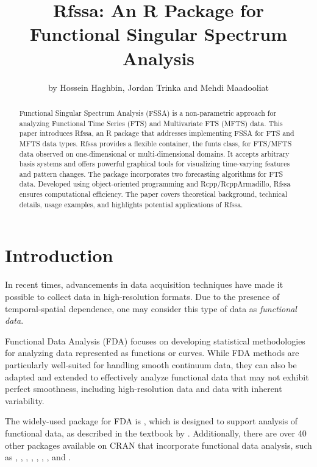 
\title{Rfssa: An R Package for Functional Singular Spectrum Analysis}

\author{by Hossein Haghbin, Jordan Trinka and Mehdi Maadooliat}

\maketitle

\begin{abstract}

Functional Singular Spectrum Analysis (FSSA) is a non-parametric approach for analyzing Functional Time Series (FTS) and Multivariate FTS (MFTS) data. This paper introduces Rfssa, an R package that addresses implementing FSSA for FTS and MFTS data types. Rfssa provides a flexible container, the funts class, for FTS/MFTS data observed on one-dimensional or multi-dimensional domains. It accepts arbitrary basis systems and offers powerful graphical tools for visualizing time-varying features and pattern changes. The package incorporates two forecasting algorithms for FTS data. Developed using object-oriented programming and Rcpp/RcppArmadillo, Rfssa ensures computational efficiency. The paper covers theoretical background, technical details, usage examples, and highlights potential applications of Rfssa.
\end{abstract}

\section{Introduction}\label{sec:introduction}

In recent times, advancements in data acquisition techniques have made it possible to collect data in high-resolution formats. Due to the presence of temporal-spatial dependence, one may consider this type of data as \textit{functional data}.

Functional Data Analysis (FDA) focuses on developing statistical methodologies for analyzing data represented as functions or curves. While FDA methods are particularly well-suited for handling smooth continuum data, they can also be adapted and extended to effectively analyze functional data that may not exhibit perfect smoothness, including high-resolution data and data with inherent variability.

The widely-used  package for FDA is  \citep{fdapackage}, which is designed to support analysis of functional data, as described in the textbook by \cite{ramsay2005}. Additionally, there are over 40 other  packages available on CRAN that incorporate functional data analysis, such as  \citep{funFEMpackage},  \citep{fdauscpackage},  \citep{refundpackage},  \citep{fdapacepackage},  \citep{funDatapackage},  \citep{ftsspecpackage},  \citep{rainbowpackage}, and  \citep{ftsapackage}.

